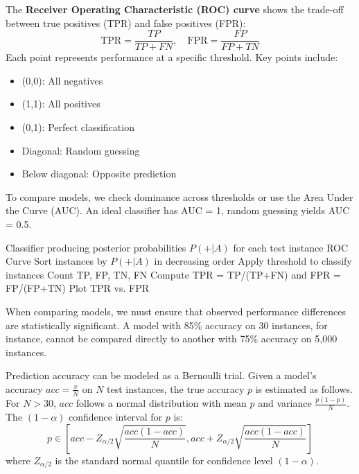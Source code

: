 \begin{definition}
The \textbf{Receiver Operating Characteristic (ROC) curve} shows the trade-off between true positives (TPR) and false positives (FPR):
\begin{equation}
\text{TPR} = \frac{TP}{TP + FN}, \quad \text{FPR} = \frac{FP}{FP + TN}
\end{equation}
Each point represents performance at a specific threshold. Key points include:
\begin{itemize}
\item (0,0): All negatives
\item (1,1): All positives
\item (0,1): Perfect classification
\item Diagonal: Random guessing
\item Below diagonal: Opposite prediction
\end{itemize}
To compare models, we check dominance across thresholds or use the Area Under the Curve (AUC). An ideal classifier has AUC = 1, random guessing yields AUC = 0.5.
\end{definition}

\begin{algorithm}
\caption{ROC Curve Construction}
\begin{algorithmic}
\Require Classifier producing posterior probabilities $P(+|A)$ for each test instance
\Ensure ROC Curve
\State Sort instances by $P(+|A)$ in decreasing order
    \State Apply threshold to classify instances
    \State Count TP, FP, TN, FN
    \State Compute TPR = TP/(TP+FN) and FPR = FP/(FP+TN)
\EndFor
\State Plot TPR vs. FPR
\end{algorithmic}
\end{algorithm}

When comparing models, we must ensure that observed performance differences are statistically significant. A model with 85\% accuracy on 30 instances, for instance, cannot be compared directly to another with 75\% accuracy on 5,000 instances.

\begin{definition}
Prediction accuracy can be modeled as a Bernoulli trial. Given a model's accuracy $acc = \frac{x}{N}$ on $N$ test instances, the true accuracy $p$ is estimated as follows. For $N > 30$, $acc$ follows a normal distribution with mean $p$ and variance $\frac{p(1-p)}{N}$. The $(1-\alpha)$ confidence interval for $p$ is:
\begin{equation}
p \in \left[acc - Z_{\alpha/2}\sqrt{\frac{acc(1-acc)}{N}}, acc + Z_{\alpha/2}\sqrt{\frac{acc(1-acc)}{N}}\right]
\end{equation}
where $Z_{\alpha/2}$ is the standard normal quantile for confidence level $(1-\alpha)$.
\end{definition}

